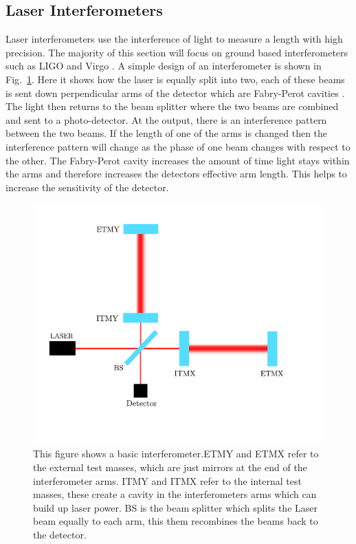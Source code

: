 \subsection{Laser Interferometers}

Laser interferometers use the interference of light to measure a length with high precision.
The majority of this section will focus on ground based interferometers such as \ac{LIGO} and Virgo \citep{aasi2015AdvancedLIGO,acernese2015AdvancedVirgo}.
A simple design of an interferometer is shown in Fig.~\ref{detectors:interferometer}. 
Here it shows how the laser is equally split into two, each of these beams is sent down perpendicular arms of the detector which are Fabry-Perot cavities \citep{}. 
The light then returns to the beam splitter where the two beams are combined and sent to a photo-detector.
At the output, there is an interference pattern between the two beams.
If the length of one of the arms is changed then the interference pattern will change as the phase of one beam changes with respect to the other.
The Fabry-Perot cavity increases the amount of time light stays within the arms and therefore increases the detectors effective arm length. This helps to increase the sensitivity of the detector.
\begin{figure}[h]
    \centering
    \includegraphics[width=\textwidth]{C1_Introduction/interferometer.pdf}
    \caption{This figure shows a basic interferometer.ETMY and ETMX refer to the external test masses, which are just mirrors at the end of the interferometer arms. ITMY and ITMX refer to the internal test masses, these create a cavity in the interferometers arms which can build up laser power. BS is the beam splitter which splits the Laser beam equally to each arm, this them recombines the beams back to the detector.}
    \label{detectors:interferometer}
\end{figure}

